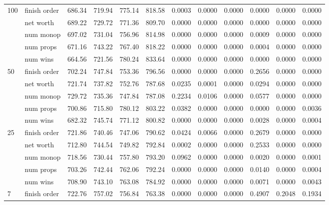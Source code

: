 \begin{landscape}
\begin{table}[ht]
\begin{tabularx}{\linewidth}{|p{1in}|p{1in}|r|r|r|r|r|r|r|r|r|r|}
      \multirow{5}{*}{100} & finish order & 686.34 & 719.94 & 775.14 & 818.58 & 0.0003 & 0.0000 & 0.0000 & 0.0000 & 0.0000 & 0.0000 \\
\cline{2-12}             & net worth & 689.22 & 729.72 & 771.36 & 809.70 & 0.0000 & 0.0000 & 0.0000 & 0.0000 & 0.0000 & 0.0000 \\
\cline{2-12}             & num monop & 697.02 & 731.04 & 756.96 & 814.98 & 0.0000 & 0.0000 & 0.0000 & 0.0009 & 0.0000 & 0.0000 \\
\cline{2-12}             & num props & 671.16 & 743.22 & 767.40 & 818.22 & 0.0000 & 0.0000 & 0.0000 & 0.0004 & 0.0000 & 0.0000 \\
\cline{2-12}             & num wins & 664.56 & 721.56 & 780.24 & 833.64 & 0.0000 & 0.0000 & 0.0000 & 0.0000 & 0.0000 & 0.0000 \\
\cline{1-12}
      \multirow{5}{*}{50} & finish order & 702.24 & 747.84 & 753.36 & 796.56 & 0.0000 & 0.0000 & 0.0000 & 0.2656 & 0.0000 & 0.0000 \\
\cline{2-12}             & net worth & 721.74 & 737.82 & 752.76 & 787.68 & 0.0235 & 0.0001 & 0.0000 & 0.0294 & 0.0000 & 0.0000 \\
\cline{2-12}             & num monop & 729.72 & 735.36 & 747.84 & 787.08 & 0.2234 & 0.0106 & 0.0000 & 0.0577 & 0.0000 & 0.0000 \\
\cline{2-12}             & num props & 700.86 & 715.80 & 780.12 & 803.22 & 0.0382 & 0.0000 & 0.0000 & 0.0000 & 0.0000 & 0.0036 \\
\cline{2-12}             & num wins & 682.32 & 745.74 & 771.12 & 800.82 & 0.0000 & 0.0000 & 0.0000 & 0.0028 & 0.0000 & 0.0004 \\
\cline{1-12}
      \multirow{5}{*}{25} & finish order & 721.86 & 740.46 & 747.06 & 790.62 & 0.0424 & 0.0066 & 0.0000 & 0.2679 & 0.0000 & 0.0000 \\
\cline{2-12}             & net worth & 712.80 & 744.54 & 749.82 & 792.84 & 0.0002 & 0.0000 & 0.0000 & 0.2533 & 0.0000 & 0.0000 \\
\cline{2-12}             & num monop & 718.56 & 730.44 & 757.80 & 793.20 & 0.0962 & 0.0000 & 0.0000 & 0.0020 & 0.0000 & 0.0001 \\
\cline{2-12}             & num props & 703.26 & 742.44 & 762.06 & 792.24 & 0.0000 & 0.0000 & 0.0000 & 0.0140 & 0.0000 & 0.0004 \\
\cline{2-12}             & num wins & 708.90 & 743.10 & 763.08 & 784.92 & 0.0000 & 0.0000 & 0.0000 & 0.0071 & 0.0000 & 0.0043 \\
\cline{1-12}
      \multirow{5}{*}{7} & finish order & 722.76 & 757.02 & 756.84 & 763.38 & 0.0000 & 0.0000 & 0.0000 & 0.4907 & 0.2048 & 0.1934 \\

\end{tabularx}
\end{table}
\end{landscape}
